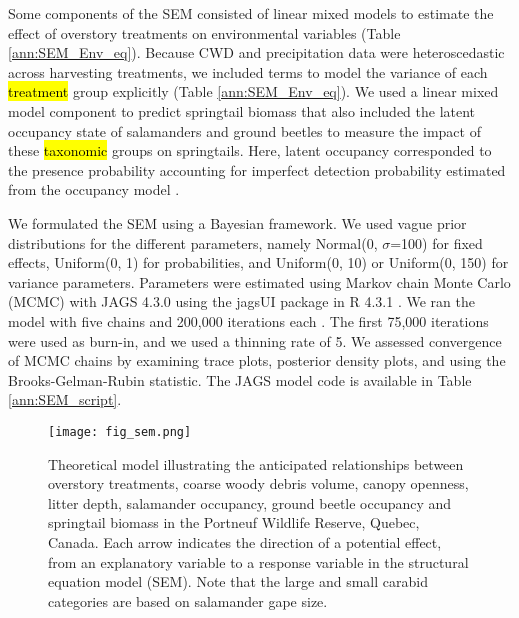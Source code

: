 Some components of the SEM consisted of linear mixed models to estimate the effect of overstory treatments on environmental variables (Table \ref{ann:SEM_Env_eq}). 
Because CWD and precipitation data were heteroscedastic across harvesting treatments, we included terms to model the variance of each \hl{treatment} group explicitly (Table \ref{ann:SEM_Env_eq}). 
We used a linear mixed model component to predict springtail biomass that also included the latent occupancy state of salamanders and ground beetles to measure the impact of these \hl{taxonomic} groups on springtails. 
Here, latent occupancy corresponded to the presence probability accounting for imperfect detection probability estimated from the occupancy model \citep{mackenzieOccupancyEstimationModeling2006a}.

We formulated the SEM using a Bayesian framework. 
We used vague prior distributions for the different parameters, namely Normal(0, $\sigma$=100) for fixed effects, Uniform(0, 1) for probabilities, and Uniform(0, 10) or Uniform(0, 150) for variance parameters. 
Parameters were estimated using Markov chain Monte Carlo (MCMC) with JAGS 4.3.0 using the jagsUI package in R 4.3.1 \citep{lunnBUGSProjectEvolution2009,rcoreteamLanguageEnvironmentStatistical2020,kellnerJagsUIWrapperRjags2024}. 
We ran the model with five chains and 200,000 iterations each \citep{gelmanUnderstandingPredictiveInformation2014}. 
The first 75,000 iterations were used as burn-in, and we used a thinning rate of 5. 
We assessed convergence of MCMC chains by examining trace plots, posterior density plots, and using the Brooks-Gelman-Rubin statistic. 
The JAGS model code is available in Table \ref{ann:SEM_script}.

\vspace{10pt}

\begin{figure}[h!]
	\centering
	\texttt{[image: fig\_sem.png]}
	\caption[Theoretical model illustrating the anticipated relationships between overstory treatments, environmental variables and species groups.]
  {Theoretical model illustrating the anticipated relationships between overstory treatments, coarse woody debris volume, canopy openness, litter depth,
   salamander occupancy, ground beetle occupancy and springtail biomass in the Portneuf Wildlife Reserve, Quebec, Canada. 
   Each arrow indicates the direction of a potential effect, from an explanatory variable to a response variable in the structural equation model (SEM). 
   Note that the large and small carabid categories are based on salamander gape size.}
	\label{fig:SEM}
\end{figure} 

